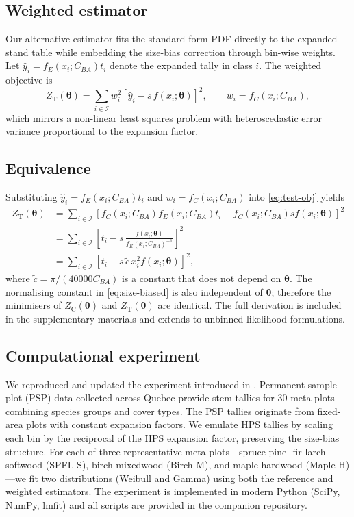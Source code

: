 \subsection{Weighted estimator}
Our alternative estimator fits the standard-form PDF directly to the expanded
stand table while embedding the size-bias correction through bin-wise weights.
Let $\hat{y}_i = f_E(x_i; C_{BA}) t_i$ denote the expanded tally in class $i$.
The weighted objective is
\begin{equation}
  Z_{\text{T}}(\boldsymbol{\theta}) =
  \sum_{i \in \mathcal{I}} w_i^2
  \left[\hat{y}_i - s \, f(x_i; \boldsymbol{\theta})\right]^2,
  \qquad
  w_i = f_C(x_i; C_{BA}),
  \label{eq:test-obj}
\end{equation}
which mirrors a non-linear least squares problem with heteroscedastic error
variance proportional to the expansion factor.

\subsection{Equivalence}
Substituting $\hat{y}_i = f_E(x_i; C_{BA}) t_i$ and $w_i = f_C(x_i; C_{BA})$
into \eqref{eq:test-obj} yields
\begin{align}
  Z_{\text{T}}(\boldsymbol{\theta})
    &= \sum_{i \in \mathcal{I}}
       \left[f_C(x_i; C_{BA}) f_E(x_i; C_{BA}) t_i - f_C(x_i; C_{BA}) s f(x_i; \boldsymbol{\theta})\right]^2 \nonumber \\
    &= \sum_{i \in \mathcal{I}}
       \left[t_i - s \, \frac{f(x_i; \boldsymbol{\theta})}{f_E(x_i; C_{BA})^{-1}}\right]^2 \nonumber \\
    &= \sum_{i \in \mathcal{I}}
       \left[t_i - s \, \tilde{c} \, x_i^2 f(x_i; \boldsymbol{\theta})\right]^2,
\end{align}
where $\tilde{c} = \pi/(40000 C_{BA})$ is a constant that does not depend on
$\boldsymbol{\theta}$. The normalising constant in \eqref{eq:size-biased} is
also independent of $\boldsymbol{\theta}$; therefore the minimisers of
$Z_{\text{C}}(\boldsymbol{\theta})$ and $Z_{\text{T}}(\boldsymbol{\theta})$ are
identical. The full derivation is included in the supplementary materials and
extends to unbinned likelihood formulations.

\subsection{Computational experiment}
We reproduced and updated the experiment introduced in
\citet{paradis2019submitted}. Permanent sample plot (PSP) data collected across
Quebec \citep{gouvernement2019} provide stem tallies for 30 meta-plots
combining species groups and cover types. The PSP tallies originate from
fixed-area plots with constant expansion factors. We emulate HPS tallies by
scaling each bin by the reciprocal of the HPS expansion factor, preserving the
size-bias structure. For each of three representative meta-plots---spruce-pine-
fir-larch softwood (SPFL-S), birch mixedwood (Birch-M), and maple hardwood
(Maple-H)---we fit two distributions (Weibull and Gamma) using both the
reference and weighted estimators. The experiment is implemented in modern
Python (SciPy, NumPy, lmfit) and all scripts are provided in the companion
repository.
